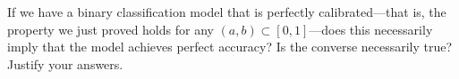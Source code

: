 \item {}
If we have a binary classification model that is perfectly calibrated---that
is, the property we just proved holds for any $(a, b) \subset [0, 1]$---does
this necessarily imply that the model achieves perfect accuracy? Is the
converse necessarily true? Justify your answers.

